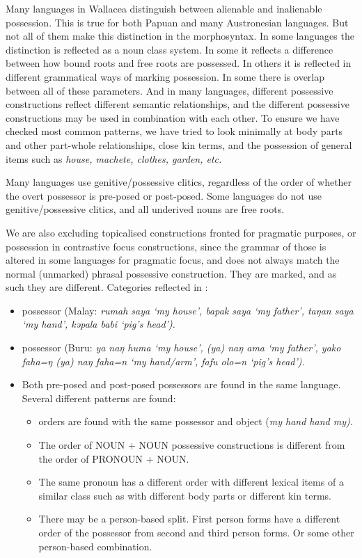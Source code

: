 Many languages in Wallacea distinguish between alienable and inalienable possession.
This is true for both Papuan
and many Austronesian languages.
But not all of them make this distinction in the morphosyntax.
In some languages the distinction is reflected as a noun class system.
In some it reflects a difference between how bound roots
and free roots are possessed.
In others it is reflected in different grammatical ways of marking possession.
In some there is overlap between all of these parameters.
And in many languages,
different possessive constructions reflect different semantic
relationships, and the different possessive constructions may be used in combination with each other.
To ensure we have checked most common patterns,
we have tried to look minimally at body parts
and other part-whole relationships,
close kin terms, and the possession of general items such as
\it{house, machete, clothes, garden}, etc.

Many languages use genitive/possessive clitics,
regardless of the order of whether the overt possessor is pre-posed or post-posed.
Some languages do not use genitive/possessive clitics,
and all underived nouns are free roots.

We are also excluding topicalised constructions fronted for pragmatic
purposes, or possession in contrastive focus constructions,
since the grammar of those is altered in some languages for pragmatic
focus, and does not always match the normal (unmarked) phrasal possessive construction.
They are marked, and as such they are different.
Categories reflected in :

\begin{itemize}
	\item {} possessor (Malay: \it{rumah saya} ‘my
				house’, \it{bapak saya} ‘my father’\it{,
				taŋan saya} ‘my hand’,
				\it{kəpala babi} ‘pig’s head’).
	\item {} possessor (Buru: \it{ya naŋ huma} ‘my
				house’, \it{(ya) naŋ ama} ‘my father’,
				\it{yako faha=ŋ {\tl} (ya) naŋ faha=n} ‘my hand/arm’,
				\it{fafu olo=n} ‘pig’s head’).
	\item Both pre-posed
				and post-posed possessors are found in the same language.
				Several different patterns are found:
	\begin{itemize}
		\item	{} orders are found with the same possessor
					and object (\it{my hand {\tl} hand my}).
		\item	The order of NOUN + NOUN possessive constructions is different
					from the order of PRONOUN + NOUN.
		\item	The same pronoun has a different order with different lexical
					items of a similar class such as with different
					body parts or different kin terms.
		\item	There may be a person-based split.
					First person forms have a different order of the possessor from
					second and third person forms.
					Or some other person-based combination.
	\end{itemize}
\end{itemize}

